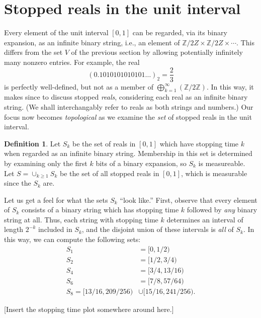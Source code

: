 \documentclass[12pt]{amsart}
\newcommand{\Z}{\mathbb{Z}}
\theoremstyle{definition}
\newtheorem{definition}{Definition}
\begin{document}
\section{Stopped reals in the unit interval}
\label{sec:stopped_points_in_the_unit_interval}

Every element of the unit interval $[0, 1]$ can be regarded, via its binary
expansion, as an infinite binary string, i.e., an element of $\Z / 2 Z \times
\Z / 2Z \times \cdots$. This differs from the set $V$ of the previous section
by allowing potentially infinitely many nonzero entries. For example, the real
\begin{equation*}
    (0.1010101010101\dots)_2 = \frac{2}{3}
\end{equation*}
is perfectly well-defined, but not as a member of $\bigoplus_{k = 1}^\infty (\Z
/ 2 \Z)$. In this way, it makes since to discuss stopped \emph{reals},
considering each real as an infinite binary string. (We shall interchangably
refer to reals as both strings and numbers.) Our focus now becomes
\emph{topological} as we examine the \emph{set} of stopped reals in the unit
interval.

\begin{definition}
    Let $S_k$ be the set of reals in $[0, 1]$ which have stopping time $k$ when
    regarded as an infinite binary string. Membership in this set is determined
    by examining only the first $k$ bits of a binary expansion, so $S_k$ is
    measureable. Let $S = \cup_{k \geq 1} S_k$ be the set of all stopped reals
    in $[0, 1]$, which is measurable since the $S_k$ are.
\end{definition}

Let us get a feel for what the sets $S_k$ ``look like.'' First, observe that
every element of $S_k$ consists of a binary string which has stopping time $k$
followed by \emph{any} binary string at all. Thus, each string with stopping
time $k$ determines an interval of length $2^{-k}$ included in $S_k$, and the
disjoint union of these intervals is \emph{all} of $S_k$. In this way, we can
compute the following sets:
\begin{align*}
    S_1 &= [0, 1/2) \\
    S_2 &= [1/2, 3/4) \\
    S_4 &= [3/4, 13/16) \\
    S_6 &= [7/8, 57/64) \\
    S_8 = [13/16, 209/256) &\cup [15/16, 241/256).
\end{align*}

[Insert the stopping time plot somewhere around here.]
\end{document}
